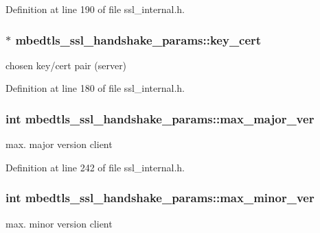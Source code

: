 Definition at line 190 of file ssl\-\_\-internal.\-h.

\hypertarget{structmbedtls__ssl__handshake__params_a149899c222855d2cc33aa4cc326b09cd}{
\subsubsection[{key\-\_\-cert}]{$\ast$ mbedtls\-\_\-ssl\-\_\-handshake\-\_\-params\-::key\-\_\-cert}}\label{structmbedtls__ssl__handshake__params_a149899c222855d2cc33aa4cc326b09cd}
chosen key/cert pair (server) 

Definition at line 180 of file ssl\-\_\-internal.\-h.

\hypertarget{structmbedtls__ssl__handshake__params_a43b54e0e0bb2b88402aa038ba85141a1}{
\subsubsection[{max\-\_\-major\-\_\-ver}]{\setlength{\rightskip}{0pt plus 5cm}int mbedtls\-\_\-ssl\-\_\-handshake\-\_\-params\-::max\-\_\-major\-\_\-ver}}\label{structmbedtls__ssl__handshake__params_a43b54e0e0bb2b88402aa038ba85141a1}
max. major version client 

Definition at line 242 of file ssl\-\_\-internal.\-h.

\hypertarget{structmbedtls__ssl__handshake__params_a23245feaafac570f7e64b3e3c2ef90d3}{
\subsubsection[{max\-\_\-minor\-\_\-ver}]{\setlength{\rightskip}{0pt plus 5cm}int mbedtls\-\_\-ssl\-\_\-handshake\-\_\-params\-::max\-\_\-minor\-\_\-ver}}\label{structmbedtls__ssl__handshake__params_a23245feaafac570f7e64b3e3c2ef90d3}
max. minor version client 


